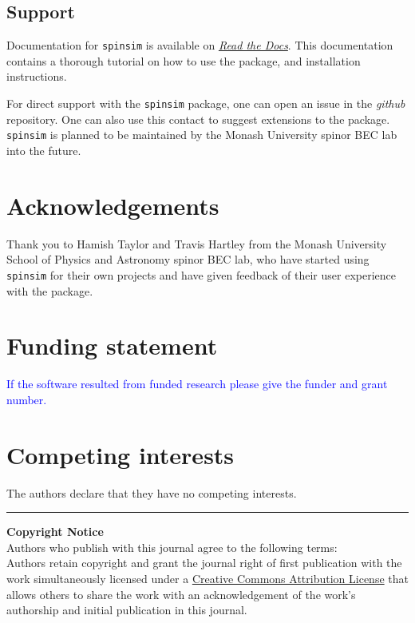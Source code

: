 \documentclass{jors}
\begin{document}
	\subsection*{Support}
		Documentation for \texttt{spinsim} is available on \href{https://spinsim.readthedocs.io/en/latest/}{\emph{Read the Docs}}. This documentation contains a thorough tutorial on how to use the package, and installation instructions.
		
		For direct support with the \texttt{spinsim} package, one can open an issue in the \emph{github} repository. One can also use this contact to suggest extensions to the package. \texttt{spinsim} is planned to be maintained by the Monash University spinor BEC lab into the future.

\section*{Acknowledgements}

Thank you to Hamish Taylor and Travis Hartley from the Monash University School of Physics and Astronomy spinor BEC lab, who have started using \texttt{spinsim} for their own projects and have given feedback of their user experience with the package.

\section*{Funding statement}

\textcolor{blue}{If the software resulted from funded research please give the funder and grant number.}

\section*{Competing interests}

The authors declare that they have no competing interests.

{}


\vspace{2cm}

\rule{\textwidth}{1pt}

{ \bf Copyright Notice} \\
Authors who publish with this journal agree to the following terms: \\

Authors retain copyright and grant the journal right of first publication with the work simultaneously licensed under a  \href{http://creativecommons.org/licenses/by/3.0/}{Creative Commons Attribution License} that allows others to share the work with an acknowledgement of the work's authorship and initial publication in this journal. \\
\end{document}
